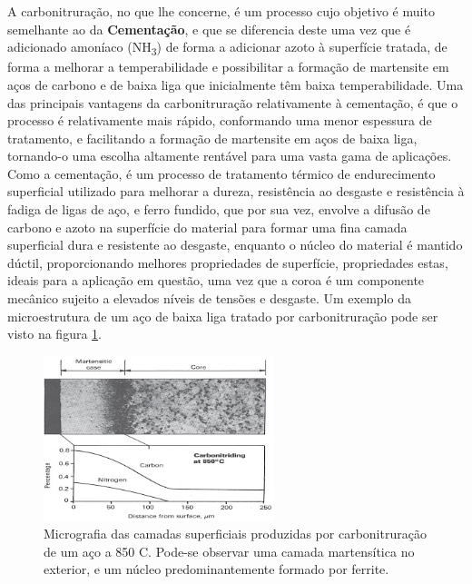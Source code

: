 A carbonitruração, no que lhe concerne, é um processo cujo objetivo é muito semelhante ao da \textbf{Cementação}, e que se diferencia deste uma vez que é adicionado amoníaco (NH\textsubscript{3}) de forma a adicionar azoto à superfície tratada, de forma a melhorar a temperabilidade e possibilitar a formação de martensite em aços de carbono e de baixa liga que inicialmente têm baixa temperabilidade\cite{Herring2011}. Uma das principais vantagens da carbonitruração relativamente à cementação, é que o processo é relativamente mais rápido, conformando uma menor espessura de tratamento, e facilitando a formação de martensite em aços de baixa liga, tornando-o uma escolha altamente rentável para uma vasta gama de aplicações.
Como a cementação, é um processo de tratamento térmico de endurecimento superficial utilizado para melhorar a dureza, resistência ao desgaste e resistência à fadiga de ligas de aço, e ferro fundido, que por sua vez, envolve a difusão de carbono e azoto na superfície do material para formar uma fina camada superficial dura e resistente ao desgaste, enquanto o núcleo do material é mantido dúctil, proporcionando melhores propriedades de superfície, propriedades estas, ideais para a aplicação em questão, uma vez que a coroa é um componente mecânico sujeito a elevados níveis de tensões e desgaste\cite{Bryson2009}. Um exemplo da microestrutura de um aço de baixa liga tratado por carbonitruração pode ser visto na figura \ref{fig:Carbonitriding_microstructure}.
\begin{figure}[htb]
    \centering
    \includegraphics[width = 0.6\textwidth]{Figures/Cap2/Carbonitriding_microstructure.png}
    \caption[Micrografia de uma peça tratada por carbonitruração]%
    {Micrografia das camadas superficiais produzidas por carbonitruração de um aço a 850 \textdegree C. Pode-se observar uma camada martensítica no exterior, e um núcleo predominantemente formado por ferrite\cite{Herring2011}.}
    \label{fig:Carbonitriding_microstructure}
\end{figure}
